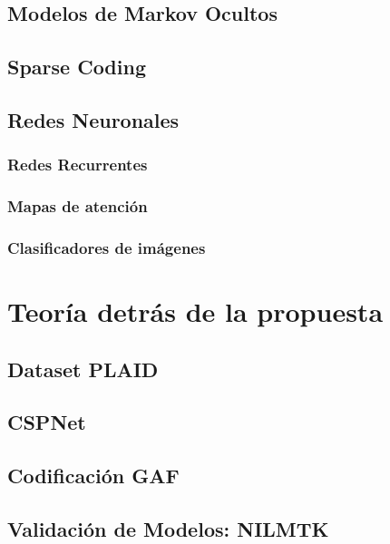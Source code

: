 \subsection{Modelos de Markov Ocultos}


\subsection{Sparse Coding}


\subsection{Redes Neuronales}
\subsubsection{Redes Recurrentes}
\subsubsection{Mapas de atención}
\subsubsection{Clasificadores de imágenes}


\section{Teoría detrás de la propuesta}
\subsection{Dataset PLAID}
\subsection{CSPNet} 
\subsection{Codificación GAF} 
\subsection{Validación de Modelos: NILMTK}  

